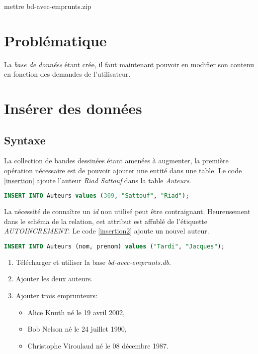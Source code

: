 \documentclass[a4paper,11pt]{article}
\begin{document}
\begin{Form}
\begin{commentprof}
mettre bd-avec-emprunts.zip
\end{commentprof}
\section{Problématique}
La \emph{base de données} étant crée, il faut maintenant pouvoir en modifier son contenu en fonction des demandes de l'utilisateur.
\begin{center}
\end{center}
\section{Insérer des données}
\subsection{Syntaxe}
La collection de bandes dessinées étant amenées à augmenter, la première opération nécessaire est de pouvoir ajouter une entité dans une table. Le code \ref{insertion} ajoute l'auteur \emph{Riad Sattouf} dans la table \emph{Auteurs}.
\begin{center}
\begin{lstlisting}[language=SQL]
INSERT INTO Auteurs values (309, "Sattouf", "Riad");
\end{lstlisting}
\label{insertion}
\end{center}
La nécessité de connaître un \emph{id} non utilisé peut être contraignant. Heureusement dans le schéma de la relation, cet attribut est affublé de l'étiquette \emph{AUTOINCREMENT}. Le code \ref{insertion2} ajoute un nouvel auteur.
\begin{center}
\begin{lstlisting}[language=SQL]
INSERT INTO Auteurs (nom, prenom) values ("Tardi", "Jacques");
\end{lstlisting}
\label{insertion2}
\end{center}
\begin{activite}
\begin{enumerate}
\item Télécharger et utiliser la base \emph{bd-avec-emprunts.db}.
\item Ajouter les deux auteurs.
\item Ajouter trois emprunteurs:
\begin{itemize}
\item Alice Knuth né le 19 avril 2002, 
\item Bob Nelson né le 24 juillet 1990,
\item Christophe Viroulaud né le 08 décembre 1987.
\end{itemize}
\end{enumerate}
\end{activite}

\end{Form}
\end{document}
